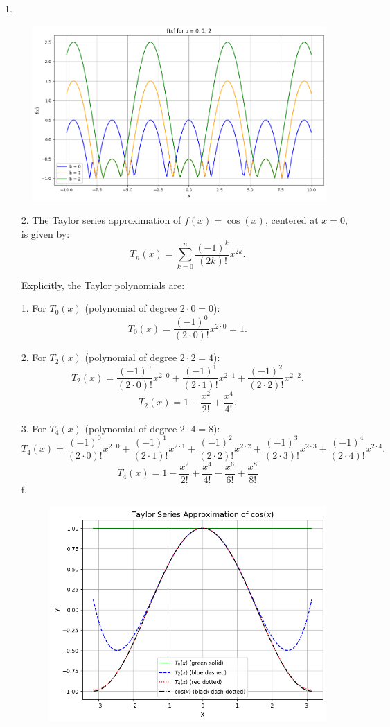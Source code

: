 \documentclass[12pt]{article}
\begin{document}
1. 
\begin{figure}[h]
    \centering
    \includegraphics[width=0.75\linewidth]{AMath301/image.png}
\end{figure}
\begin{enumerate}




\item [2. ] The Taylor series approximation of \( f(x) = \cos(x) \), centered at \( x = 0 \), is given by:
\[
T_n(x) = \sum_{k=0}^n \frac{(-1)^k}{(2k)!} x^{2k}.
\]

Explicitly, the Taylor polynomials are:

1. For \( T_0(x) \) (polynomial of degree \( 2 \cdot 0 = 0 \)):
\[
T_0(x) = \frac{(-1)^0}{(2 \cdot 0)!} x^{2 \cdot 0} = 1.
\]

2. For \( T_2(x) \) (polynomial of degree \( 2 \cdot 2 = 4 \)):
\[
T_2(x) = \frac{(-1)^0}{(2 \cdot 0)!} x^{2 \cdot 0} 
+ \frac{(-1)^1}{(2 \cdot 1)!} x^{2 \cdot 1}
+ \frac{(-1)^2}{(2 \cdot 2)!} x^{2 \cdot 2}.
\]
\[
T_2(x) = 1 - \frac{x^2}{2!} + \frac{x^4}{4!}.
\]

3. For \( T_4(x) \) (polynomial of degree \( 2 \cdot 4 = 8 \)):
\[
T_4(x) = \frac{(-1)^0}{(2 \cdot 0)!} x^{2 \cdot 0} 
+ \frac{(-1)^1}{(2 \cdot 1)!} x^{2 \cdot 1}
+ \frac{(-1)^2}{(2 \cdot 2)!} x^{2 \cdot 2}
+ \frac{(-1)^3}{(2 \cdot 3)!} x^{2 \cdot 3}
+ \frac{(-1)^4}{(2 \cdot 4)!} x^{2 \cdot 4}.
\]
\[
T_4(x) = 1 - \frac{x^2}{2!} + \frac{x^4}{4!} - \frac{x^6}{6!} + \frac{x^8}{8!}
\]
\newpage
f.
\begin{figure}[h!]
    \includegraphics[width=0.75\linewidth]{AMath301/image2.png}
\end{figure}


\end{enumerate}
\end{document}
